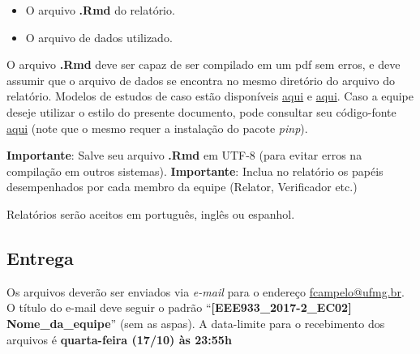 \documentclass[11pt,twocolumn,printwatermark=false]{pinp}
\providecommand{\tightlist}{%
  \setlength{\itemsep}{0pt}\setlength{\parskip}{0pt}}
\begin{document}
\begin{itemize}
\tightlist
\item
  O arquivo \textbf{.Rmd} do relatório.
\item
  O arquivo de dados utilizado.
\end{itemize}

O arquivo \textbf{.Rmd} deve ser capaz de ser compilado em um pdf sem
erros, e deve assumir que o arquivo de dados se encontra no mesmo
diretório do arquivo do relatório. Modelos de estudos de caso estão
disponíveis
\href{https://github.com/fcampelo/Design-and-Analysis-of-Experiments/tree/master/Grading/Report\%20template}{aqui}
e
\href{https://github.com/fcampelo/Design-and-Analysis-of-Experiments/tree/master/Grading/Case\%20Studies/Report\%20Examples}{aqui}.
Caso a equipe deseje utilizar o estilo do presente documento, pode
consultar seu código-fonte
\href{https://raw.githubusercontent.com/fcampelo/Design-and-Analysis-of-Experiments/master/Semester\%20files/2017-2\%20(PT)/Case\%20Studies/CS02.Rmd}{aqui}
(note que o mesmo requer a instalação do pacote \emph{pinp}).

\textbf{Importante}: Salve seu arquivo \textbf{.Rmd} em UTF-8 (para
evitar erros na compilação em outros sistemas). \textbf{Importante}:
Inclua no relatório os papéis desempenhados por cada membro da equipe
(Relator, Verificador etc.)

Relatórios serão aceitos em português, inglês ou espanhol.

\subsection{Entrega}\label{entrega}

Os arquivos deverão ser enviados via \emph{e-mail} para o endereço
\url{fcampelo@ufmg.br}. O título do e-mail deve seguir o padrão
``\textbf{{[}EEE933\_2017-2\_EC02{]} Nome\_da\_equipe}'' (sem as aspas).
A data-limite para o recebimento dos arquivos é \textbf{quarta-feira
(17/10) às 23:55h}


\pnasbreak 
\end{document}
